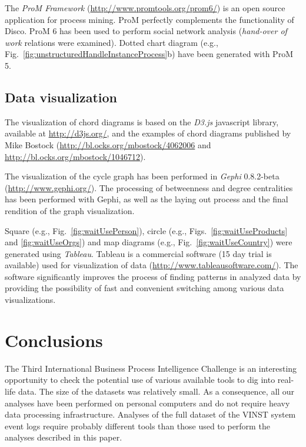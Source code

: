 \documentclass[lnbip]{svmultln}
\begin{document}
 
The \emph{ProM Framework} (\url{http://www.promtools.org/prom6/}) is an open source application for process mining. ProM perfectly complements the functionality of Disco. ProM 6 has been used to perform social network analysis (\emph{hand-over of work} relations were examined). Dotted chart diagram (e.g., Fig.~\ref{fig:unstructuredHandleInstanceProcess}b) have been generated with ProM 5.

\subsection{Data visualization}
The visualization of chord diagrams is based on the \emph{D3.js} javascript library, available at \url{http://d3js.org/}, and the examples of chord diagrams published by Mike Bostock (\url{http://bl.ocks.org/mbostock/4062006} and \url{http://bl.ocks.org/mbostock/1046712}).

The visualization of the cycle graph has been performed in \emph{Gephi} 0.8.2-beta (\url{http://www.gephi.org/}). The processing of betweenness and degree centralities has been performed with Gephi, as well as the laying out process and the final rendition of the graph visualization.

Square (e.g., Fig.~\ref{fig:waitUsePerson}), circle (e.g., Figs.~\ref{fig:waitUseProducts} and \ref{fig:waitUseOrgs}) and map diagrams (e.g., Fig.~\ref{fig:waitUseCountry}) were generated using \emph{Tableau}. Tableau is a commercial software (15 day trial is available) used for visualization of data (\url{http://www.tableausoftware.com/}).  The software significantly improves the process of finding patterns in analyzed data by providing the possibility of fast and convenient switching among various data visualizations. 


\section{Conclusions}
\label{sec:conclusions}

The Third International Business Process Intelligence Challenge is an interesting opportunity to check the potential use of various available tools to dig into real-life data. The size of the datasets was relatively small. As a consequence, all our analyses have been performed on personal computers and do not require heavy data processing infrastructure. Analyses of the full dataset of the VINST system event logs require probably different tools than those used to perform the analyses described in this paper.
\end{document}
